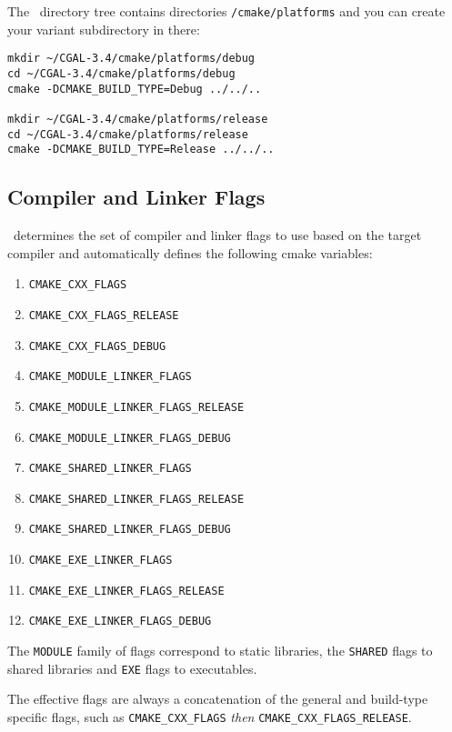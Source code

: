 The \cgal\ directory tree contains directories \cgaldir{}\texttt{/cmake/platforms} and you can create your 
variant subdirectory in there:

{\ccTexHtml{\scriptsize}{}
\begin{verbatim}
mkdir ~/CGAL-3.4/cmake/platforms/debug
cd ~/CGAL-3.4/cmake/platforms/debug
cmake -DCMAKE_BUILD_TYPE=Debug ../../..

mkdir ~/CGAL-3.4/cmake/platforms/release
cd ~/CGAL-3.4/cmake/platforms/release
cmake -DCMAKE_BUILD_TYPE=Release ../../..
\end{verbatim}
}

\subsection{Compiler and Linker Flags}

\cmake\ determines the set of compiler and linker flags to use based on the target compiler and automatically defines
the following cmake variables:

\begin{enumerate}
\item \texttt{CMAKE\_CXX\_FLAGS}
\item \texttt{CMAKE\_CXX\_FLAGS\_RELEASE}
\item \texttt{CMAKE\_CXX\_FLAGS\_DEBUG}
\item \texttt{CMAKE\_MODULE\_LINKER\_FLAGS}
\item \texttt{CMAKE\_MODULE\_LINKER\_FLAGS\_RELEASE}
\item \texttt{CMAKE\_MODULE\_LINKER\_FLAGS\_DEBUG}
\item \texttt{CMAKE\_SHARED\_LINKER\_FLAGS}
\item \texttt{CMAKE\_SHARED\_LINKER\_FLAGS\_RELEASE}
\item \texttt{CMAKE\_SHARED\_LINKER\_FLAGS\_DEBUG}
\item \texttt{CMAKE\_EXE\_LINKER\_FLAGS}
\item \texttt{CMAKE\_EXE\_LINKER\_FLAGS\_RELEASE}
\item \texttt{CMAKE\_EXE\_LINKER\_FLAGS\_DEBUG}
 \end{enumerate}

The \texttt{MODULE} family of flags correspond to static libraries, the \texttt{SHARED} flags to shared libraries
and \texttt{EXE} flags to executables.

The effective flags are always a concatenation of the general and build-type specific flags, such as
\texttt{CMAKE\_CXX\_FLAGS} {\em then} \texttt{CMAKE\_CXX\_FLAGS\_RELEASE}.

